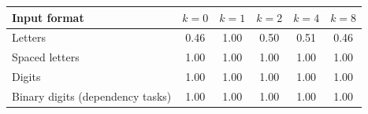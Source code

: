 \begin{tabular}{lccccc}
\toprule
Input format & $k = 0$ & $k = 1$ & $k = 2$ & $k = 4$ & $k = 8$ \\
\midrule
Letters & 0.46 & 1.00 & 0.50 & 0.51 & 0.46 \\
Spaced letters & 1.00 & 1.00 & 1.00 & 1.00 & 1.00 \\
Digits & 1.00 & 1.00 & 1.00 & 1.00 & 1.00 \\
Binary digits (dependency tasks) & 1.00 & 1.00 & 1.00 & 1.00 & 1.00 \\
\bottomrule
\end{tabular}
